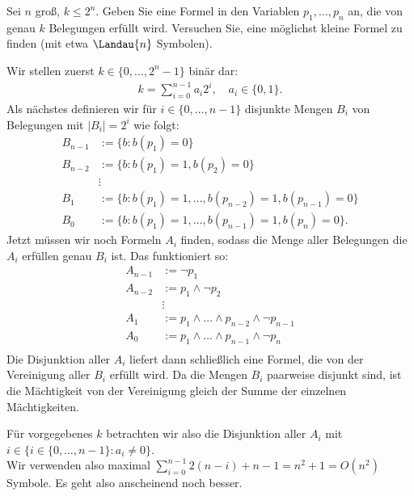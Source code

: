 
\begin{exercise}[24]

Sei $n$ groß, $k \leq 2^n$.
Geben Sie eine Formel in den Variablen $p_1, \dots, p_n$ an, die von genau $k$ Belegungen erfüllt wird.
Versuchen Sie, eine möglichst kleine Formel zu finden (mit etwa $\Landau{n}$ Symbolen).

\end{exercise}


\begin{solution}

Wir stellen zuerst $k \in \{0,\dots,2^n-1\}$ binär dar:
\begin{align*}
  k = \sum_{i=0}^{n-1}a_i2^i, \quad a_i \in \{0,1\}.
\end{align*}
Als nächstes definieren wir für $i \in \{0,\dots,n-1\}$ disjunkte Mengen $B_i$
von Belegungen mit $|B_i| = 2^i$ wie folgt:
\begin{align*}
  B_{n-1} &:= \{b: b(p_1) = 0\} \\
  B_{n-2} &:= \{b: b(p_1) = 1, b(p_2) = 0\} \\
  &\vdots \\
  B_{1} &:= \{b: b(p_1) = 1, \dots, b(p_{n-2}) = 1, b(p_{n-1}) = 0\} \\
  B_{0} &:= \{b: b(p_1) = 1, \dots, b(p_{n-1}) = 1, b(p_{n}) = 0\}.
\end{align*}
Jetzt müssen wir noch Formeln $A_i$ finden, sodass die Menge aller Belegungen die $A_i$
erfüllen genau $B_i$ ist. Das funktioniert so:
\begin{align*}
  A_{n-1} &:= \neg p_1 \\
  A_{n-2} &:= p_1 \land \neg p_2 \\
  &\vdots \\
  A_{1} &:= p_1 \land \dots \land p_{n-2} \land \neg p_{n-1}\\
  A_{0} &:= p_1 \land \dots \land p_{n-1} \land \neg p_{n}\\
\end{align*}
Die Disjunktion aller $A_i$ liefert dann schließlich eine Formel, die von der
Vereinigung aller $B_i$ erfüllt wird.
Da die Mengen $B_i$ paarweise disjunkt sind, ist die Mächtigkeit von der Vereinigung
gleich der Summe der einzelnen Mächtigkeiten.

Für vorgegebenes $k$ betrachten wir also die Disjunktion aller $A_i$ mit $i \in \{i \in \{0,\dots,n-1\}: a_i \neq 0 \}$. \\
Wir verwenden also maximal $\sum_{i=0}^{n-1}2(n-i) + n - 1 = n^2 + 1 = O(n^2)$ Symbole. Es geht also anscheinend noch besser.


\end{solution}
